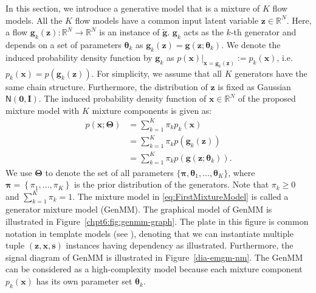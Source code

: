 In this section, we introduce a generative model that is a mixture of $K$ flow models. All the $K$ flow models have a common input latent variable $\bm{z} \in \mathbb{R}^N$. Here, a flow $\bm{g}_k(\bm{z}): \mathbb{R}^N
\rightarrow \mathbb{R}^N$ is an instance of $\tilde{\bm{g}}$. $\bm{g}_k$ acts as the $k$-th generator and depends on a set of parameters $\bm{\theta}_k$ as
$\bm{g}_k(\bm{z})=\bm{g}(\bm{z};\boldsymbol{\theta}_k)$. We denote the induced probability density function by $\bm{g}_k$ as $p(\bm{x})|_{\bm{x}=\bm{g}_k(\bm{z})}:=p_k(\bm{x})$, i.e. $p_k(\bm{x})=p(\bm{g}_k(\bm{z}))$. For simplicity, we assume that all $K$ generators have the same chain structure. Furthermore, the distribution of $\bm{z}$ is fixed as Gaussian $\mathsf{N}(\bm{0},\bm{I})$.
The induced probability density function of $\bm{x} \in \mathbb{R}^N$ of the proposed mixture model with $K$ mixture components is given as:
\begin{align}\label{eq:FirstMixtureModel}
  p(\bm{x};\bm{\Theta})  &= \textstyle\sum_{k=1}^K \pi_k  p_k(\bm{x}) \nonumber\\
                         &= \textstyle \sum_{k=1}^K \pi_k  p(\bm{g}_k(\bm{z}))\nonumber\\
                         &= \textstyle \sum_{k=1}^K \pi_k  p(\bm{g}(\bm{z};\boldsymbol{\theta}_k)).
\end{align}
We use $\bm{\Theta}$ to denote the set of all parameters $ \{\bm{\pi},\bm{\theta}_1, \dots, \bm{\theta}_K \}$, where $\bm{\pi} = \left\{ \pi_1, \hdots, \pi_K \right\}$ is the prior distribution of the generators. Note that $\pi_k \geq 0$ and $\sum_{k=1}^K \pi_k =1$. The mixture model
in \eqref{eq:FirstMixtureModel} is called a generator mixture model (GenMM). The graphical model of GenMM is illustrated in Figure~\ref{chpt6:fig:genmm-graph}. The plate in this figure is common notation in template models (see \cite[Section~6]{koller2009pgm}), denoting that we can instantiate multiple tuple $(\bm{z}, \bm{x}, \bm{s})$ instances having dependency as illustrated. Furthermore, the
signal diagram of GenMM is illustrated in Figure~\ref{dia-emgm-nm}. The GenMM can be considered as a high-complexity model because each mixture component $p_k(\bm{x})$ has its own parameter set $\bm{\theta}_k$. 

